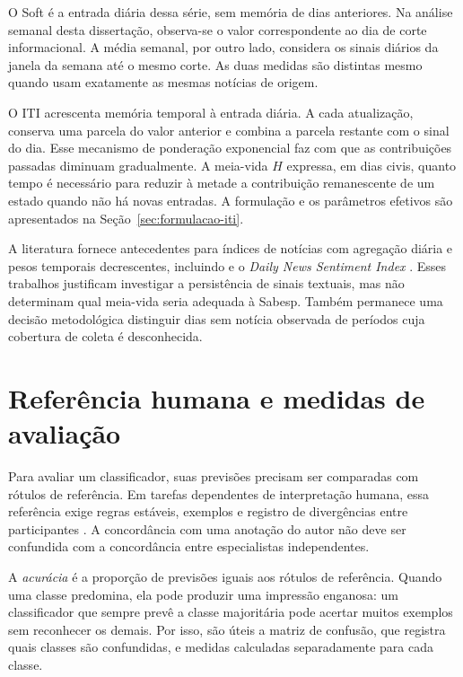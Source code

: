 O Soft é a entrada diária dessa série, sem memória de dias anteriores. Na análise semanal desta dissertação, observa-se o valor correspondente ao dia de corte informacional. A média semanal, por outro lado, considera os sinais diários da janela da semana até o mesmo corte. As duas medidas são distintas mesmo quando usam exatamente as mesmas notícias de origem.

O ITI acrescenta memória temporal à entrada diária. A cada atualização, conserva uma parcela do valor anterior e combina a parcela restante com o sinal do dia. Esse mecanismo de ponderação exponencial faz com que as contribuições passadas diminuam gradualmente. A meia-vida $H$ expressa, em dias civis, quanto tempo é necessário para reduzir à metade a contribuição remanescente de um estado quando não há novas entradas. A formulação e os parâmetros efetivos são apresentados na Seção~\ref{sec:formulacao-iti}.

A literatura fornece antecedentes para índices de notícias com agregação diária e pesos temporais decrescentes, incluindo  e o \emph{Daily News Sentiment Index} \cite{buckman2020dnsi,frbsfNewsSentiment}. Esses trabalhos justificam investigar a persistência de sinais textuais, mas não determinam qual meia-vida seria adequada à Sabesp. Também permanece uma decisão metodológica distinguir dias sem notícia observada de períodos cuja cobertura de coleta é desconhecida.

\section{Referência humana e medidas de avaliação}

Para avaliar um classificador, suas previsões precisam ser comparadas com rótulos de referência. Em tarefas dependentes de interpretação humana, essa referência exige regras estáveis, exemplos e registro de divergências entre participantes \cite{artstein2008agreement}. A concordância com uma anotação do autor não deve ser confundida com a concordância entre especialistas independentes.

A \emph{acurácia} é a proporção de previsões iguais aos rótulos de referência. Quando uma classe predomina, ela pode produzir uma impressão enganosa: um classificador que sempre prevê a classe majoritária pode acertar muitos exemplos sem reconhecer os demais. Por isso, são úteis a matriz de confusão, que registra quais classes são confundidas, e medidas calculadas separadamente para cada classe.

